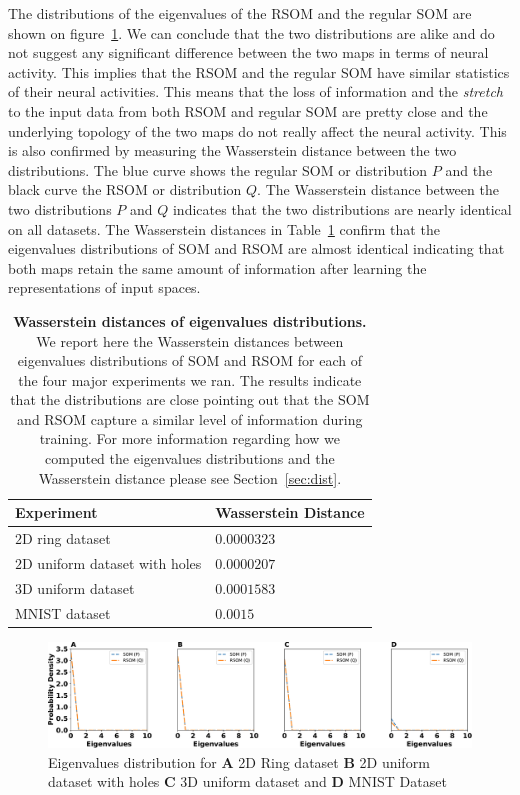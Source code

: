 The distributions of the eigenvalues of the RSOM and the regular SOM are shown on figure~\ref{fig:eigenvalues}. We can conclude that the two distributions are alike and do not suggest any significant difference between the two maps in terms of neural activity. This implies that the RSOM and the regular SOM have similar statistics of their neural activities. This means that the loss of information and the \emph{stretch} to the input data from both RSOM and regular SOM are pretty close and the underlying  topology of the two maps do not really affect the neural activity. This is also confirmed
by measuring the Wasserstein distance between the two distributions. The blue curve shows the regular SOM or distribution $P$ and the black curve the RSOM or distribution $Q$. The Wasserstein distance between the two distributions $P$ and $Q$ indicates that the two distributions are nearly identical on all datasets. The Wasserstein distances in Table~\ref{table:distances}
confirm that the eigenvalues distributions of SOM and RSOM are almost identical indicating that both maps retain the
same amount of information after learning the representations of input spaces.

\begin{table}[!ht]
  \begin{center}
    \begin{tabular}{ll}
        \textbf{Experiment} & \textbf{Wasserstein Distance} \\
        \hline
        $2$D ring dataset               & $0.0000323$\\
        $2$D uniform dataset with holes & $0.0000207$  \\
        $3$D uniform dataset            & $0.0001583$ \\
        MNIST dataset                   & $0.0015$ \\
    \end{tabular}
      \caption{\textbf{Wasserstein distances of eigenvalues distributions.} We report here the Wasserstein 
      distances between eigenvalues distributions of SOM and RSOM for each of the four major experiments we
      ran. The results indicate that the distributions are close pointing out that the SOM and RSOM capture
      a similar level of information during training. For more information regarding how we computed the 
      eigenvalues distributions and the Wasserstein distance please see Section~\ref{sec:dist}.}
      \label{table:distances}
  \end{center}
\end{table}

\begin{figure}
  \includegraphics[width=\columnwidth]{eig-distributions-new.pdf}
  \caption{Eigenvalues distribution for \textbf{A} 2D Ring dataset \textbf{B} 2D uniform dataset with holes \textbf{C} 3D uniform dataset and \textbf{D} MNIST Dataset
  }%
  \label{fig:eigenvalues}
 \end{figure}